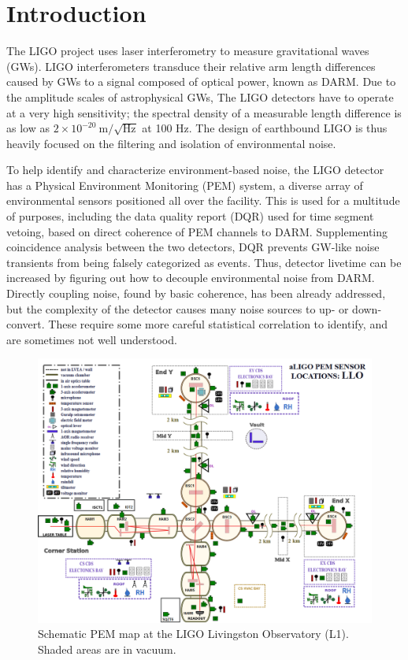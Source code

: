 \section{Introduction}
The LIGO project uses laser interferometry to measure gravitational waves (GWs).
LIGO interferometers transduce their relative arm length differences caused by GWs to a signal composed of optical power, known as DARM.
Due to the amplitude scales of astrophysical GWs, The LIGO detectors have to operate at a very high sensitivity; the spectral density of a measurable length difference is as low as $2\times 10^{-20}~\mathrm{m}/\sqrt{\mathrm{Hz}}$ at 100 Hz.
The design of earthbound LIGO is thus heavily focused on the filtering and isolation of environmental noise.

To help identify and characterize environment-based noise, the LIGO detector has a Physical Environment Monitoring (PEM) system, a diverse array of environmental sensors positioned all over the facility\cite{aepaper}.
This is used for a multitude of purposes, including the data quality report (DQR) used for time segment vetoing, based on direct coherence of PEM channels to DARM.
Supplementing coincidence analysis between the two detectors, DQR prevents GW-like noise transients from being falsely categorized as events.
Thus, detector livetime can be increased by figuring out how to decouple environmental noise from DARM.
Directly coupling noise, found by basic coherence, has been already addressed, but the complexity of the detector causes many noise sources to up- or down-convert.
These require some more careful statistical correlation to identify, and are sometimes not well understood.
\begin{figure}
\includegraphics[width=\textwidth]{assets/llopem.png}
\caption{Schematic PEM map at the LIGO Livingston Observatory (L1). Shaded areas are in vacuum.}
\end{figure}
